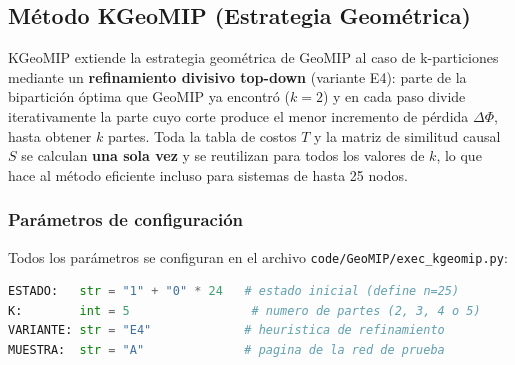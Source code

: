 \subsection{Método KGeoMIP (Estrategia Geométrica)}
\label{sec:kgeomip}

KGeoMIP extiende la estrategia geométrica de GeoMIP al caso de k-particiones mediante
un \textbf{refinamiento divisivo top-down} (variante E4): parte de la bipartición óptima
que GeoMIP ya encontró ($k=2$) y en cada paso divide iterativamente la parte cuyo corte
produce el menor incremento de pérdida $\Delta\Phi$, hasta obtener $k$ partes.
Toda la tabla de costos $T$ y la matriz de similitud causal $S$ se calculan \textbf{una
sola vez} y se reutilizan para todos los valores de $k$, lo que hace al método eficiente
incluso para sistemas de hasta 25 nodos.

\subsubsection{Parámetros de configuración}

Todos los parámetros se configuran en el archivo
\texttt{code/GeoMIP/exec\_kgeomip.py}:

\begin{lstlisting}[language=Python]
ESTADO:   str = "1" + "0" * 24   # estado inicial (define n=25)
K:        int = 5                 # numero de partes (2, 3, 4 o 5)
VARIANTE: str = "E4"             # heuristica de refinamiento
MUESTRA:  str = "A"              # pagina de la red de prueba
\end{lstlisting}


